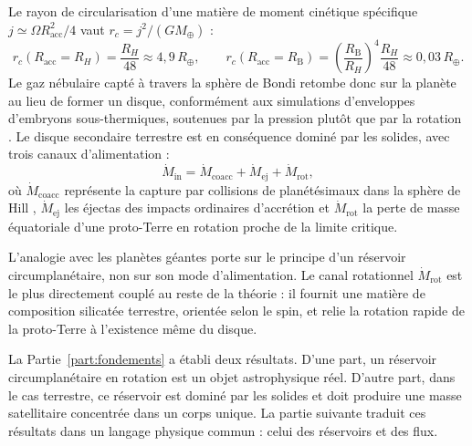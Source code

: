\documentclass[11pt,a4paper,openany]{report}
\newcommand{\Mt}{M_{\oplus}}
\newcommand{\Rt}{R_{\oplus}}
\begin{document}
Le rayon de circularisation d'une matière de moment cinétique spécifique
$j\simeq\Omega R_{\mathrm{acc}}^2/4$ vaut $r_c=j^2/(G\Mt)$ \cite{QuillenTrilling1998} :
\begin{equation}
r_c(R_{\mathrm{acc}}=R_H)=\frac{R_H}{48}\approx4{,}9\,\Rt,
\qquad
r_c(R_{\mathrm{acc}}=R_{\mathrm{B}})=\left(\frac{R_{\mathrm{B}}}{R_H}\right)^{4}
\frac{R_H}{48}\approx0{,}03\,\Rt.
\label{eq:rc}
\end{equation}
Le gaz nébulaire capté à travers la sphère de Bondi retombe donc sur la planète au lieu de
former un disque, conformément aux simulations d'enveloppes d'embryons sous-thermiques,
soutenues par la pression plutôt que par la rotation \cite{Ormel2015,Fung2015}. Le disque
secondaire terrestre est en conséquence dominé par les solides, avec trois canaux
d'alimentation :
\begin{equation}
\dot M_{\mathrm{in}}=\dot M_{\mathrm{coacc}}+\dot M_{\mathrm{ej}}+\dot M_{\mathrm{rot}},
\label{eq:canaux}
\end{equation}
où $\dot M_{\mathrm{coacc}}$ représente la capture par collisions de planétésimaux dans la sphère
de Hill \cite{Ruskol1960,Weidenschilling1986}, $\dot M_{\mathrm{ej}}$ les éjectas des impacts
ordinaires d'accrétion et $\dot M_{\mathrm{rot}}$ la perte de masse équatoriale d'une proto-Terre
en rotation proche de la limite critique.

\begin{lecture}
L'analogie avec les planètes géantes porte sur le principe d'un réservoir circumplanétaire, non
sur son mode d'alimentation. Le canal rotationnel $\dot M_{\mathrm{rot}}$ est le plus directement
couplé au reste de la théorie : il fournit une matière de composition silicatée terrestre, orientée
selon le spin, et relie la rotation rapide de la proto-Terre à l'existence même du disque.
\end{lecture}


\begin{rappel}
La Partie~\ref{part:fondements} a établi deux résultats. D'une part, un réservoir circumplanétaire
en rotation est un objet astrophysique réel. D'autre part, dans le cas terrestre, ce réservoir est
dominé par les solides et doit produire une masse satellitaire concentrée dans un corps unique.
La partie suivante traduit ces résultats dans un langage physique commun : celui des réservoirs et
des flux.
\end{rappel}
\end{document}
